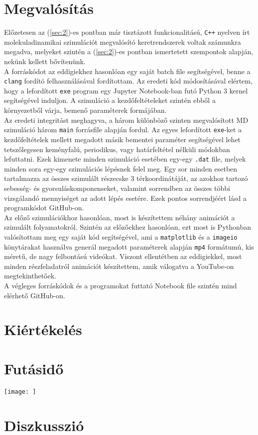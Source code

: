 \begin{multicols}{2}
\section{Megvalósítás} \label{sec:4}
Előzetesen az (\ref{sec:2})-es pontban már tisztázott funkcionalitású, \texttt{C++} nyelven írt molekuladinamikai szimulációt megvalósító keretrendszerek voltak számunkra megadva, melyeket szintén a (\ref{sec:2})-es pontban ismertetett szempontok alapján, nekünk kellett bővítenünk. \\
A forráskódot az eddigiekhez hasonlóan egy saját batch file segítségével, benne a \texttt{clang} fordító felhasználásával fordítottam. Az eredeti kód módosításával elértem, hogy a lefordított \texttt{exe} program egy Jupyter Notebook-ban futó Python 3 kernel segítségével induljon. A szimuláció a kezdőfeltételeket szintén ebből a környezetből várja, bemenő paraméterek formájában. \\
Az eredeti integritást meghagyva, a három különböző szinten megvalósított MD szimuláció három \texttt{main} forrásfile alapján fordul. Az egyes lefordított \texttt{exe}-ket a kezdőfeltételek mellett megadott másik bementei paraméter segítségével lehet tetszőlegesen keményfalú, periodikus, vagy határfeltétel nélküli módokban lefuttatni. Ezek kimenete minden szimuláció esetében egy-egy \texttt{.dat} file, melyek minden sora egy-egy szimulációs lépésnek felel meg. Egy sor minden esetben tartalmazza az összes szimulált részecske 3 térkoordinátáját, az azokhoz tartozó sebesség- és gyorsuláskomponenseket, valamint sorrendben az összes többi vizsgálandó mennyiséget az adott lépés esetére. Ezek pontos sorrendjéért lásd a programkódot GitHub-on\cite{github}. \\
Az előző szimulációkhoz hasonlóan, most is készítettem néhány animációt a szimulált folyamatokról. Szintén az előzőekhez hasonlóan, ezt most is Pythonban valósítottam meg egy saját kód segítségével, ami a \texttt{matplotlib} és a \texttt{imageio} könytárakat használva generál megadott paraméterek alapján \texttt{mp4} formátumú, kis méretű, de nagy felbontású videókat. Viszont ellentétben az eddigiekkel, most minden részfeladatról animációt készítettem, amik válogatva a YouTube-on megtekinthetőek\cite{yt}. \\
A végleges forráskódok és a programokat futtató Notebook file szintén mind elérhető GitHub-on\cite{github}.

\section{Kiértékelés} \label{sec:5}

\section{Futásidő} \label{sec:6}

{\centering\texttt{[image: ]}}
\hfill \break \break


\section{Diszkusszió} \label{sec:7}

\end{multicols}